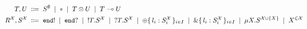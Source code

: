 \begin{align*}
  T,U \grmdef&
    S^\emptyset               \grmor
    \TUnit          \grmor
    \TPair TU      \grmor
    \TFun  T U      \\
  R^{\mathcal X}, S^{\mathcal X} \grmdef&
    \TEnd !         \grmor
    \TEnd ?         \grmor
    \TOut T S^{\mathcal X}       \grmor
    \TIn  T S^{\mathcal X}       \grmor
    \TSelect{ l_i: S^{\mathcal X}_i } \grmor
    \TCase{ l_i: S^{\mathcal X}_i }   \grmor
    \TRec[X] S^{\mathcal X \cup \{X\}}      \grmor
    X^{\in \mathcal X}
\end{align*}

